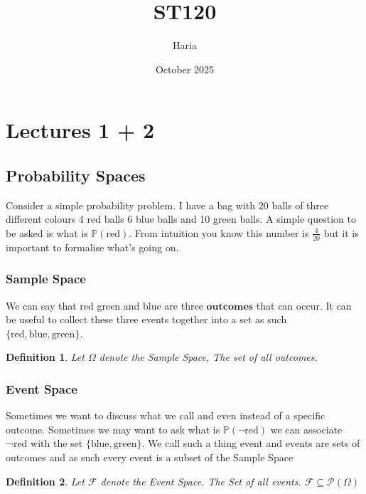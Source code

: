 \documentclass{article}
\title{ST120}
\author{Haria}
\date{October 2025}
\begin{document}
\maketitle

\section{Lectures 1 + 2}
\subsection{Probability Spaces}
\newtheorem{definition}{Definition}
\newtheorem{proposition}{Proposition}
\newtheorem{example}{Example}
Consider a simple probability problem. I have a bag with 20 balls of three different colours 4 red balls 6 blue balls and 10 green balls. A simple question to be asked is what is $\mathbb{P}(\text{red})$. From intuition you know this number is $\frac{4}{20}$ but it is important to formalise what's going on.
\subsubsection{Sample Space}
We can say that red green and blue are three $\textbf{outcomes}$ that can occur. It can be useful to collect these three events together into a set as such $\{\text{red},\text{blue},\text{green}\}$.
\begin{definition}
    Let $\Omega$ denote the Sample Space, The set of all outcomes.
\end{definition}
\subsubsection{Event Space}
Sometimes we want to discuss what we call and even instead of a specific outcome. Sometimes we may want to ask what is $\mathbb{P}(¬ \text{red})$ we can associate ¬red with the set $\{ \text{blue}, \text{green}\}$. We call such a thing event and events are sets of outcomes and as such every event is a subset of the Sample Space
\begin{definition}
    Let $\mathcal{F}$ denote the Event Space. The Set of all events. $\mathcal{F} \subseteq \mathcal{P}(\Omega)$
\end{definition}
\end{document}
